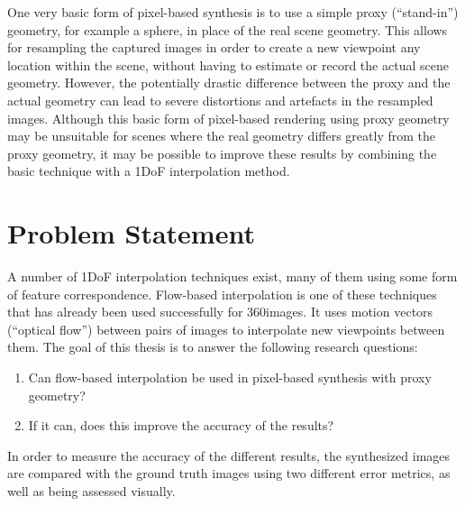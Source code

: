 One very basic form of pixel-based synthesis is to use a simple proxy (``stand-in'') geometry, for example a sphere, in place of the real scene geometry\footnotemark. This allows for resampling the captured images in order to create a new viewpoint any location within the scene, without having to estimate or record the actual scene geometry. However, the potentially drastic difference between the proxy and the actual geometry can lead to severe distortions and artefacts in the resampled images. Although this basic form of pixel-based rendering using proxy geometry may be unsuitable for scenes where the real geometry differs greatly from the proxy geometry, it may be possible to improve these results by combining the basic technique with a 1DoF interpolation method.

\section*{Problem Statement}
A number of 1DoF interpolation techniques exist, many of them using some form of feature correspondence. Flow-based interpolation is one of these techniques that has already been used successfully for 360\degree images. It uses motion vectors (``optical flow'') between pairs of images to interpolate new viewpoints between them. The goal of this thesis is to answer the following research questions:

\begin{enumerate}
  \item Can flow-based interpolation be used in pixel-based synthesis with proxy geometry?
  \item If it can, does this improve the accuracy of the results?
\end{enumerate}

In order to measure the accuracy of the different results, the synthesized images are compared with the ground truth images using two different error metrics, as well as being assessed visually.


